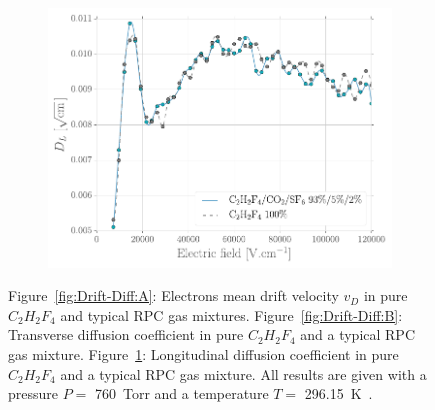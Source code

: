 \begin{figure}[H]
\begin{subfigure}{0.5\linewidth}
			\includegraphics[width = 0.55\plotwidth]{fig/chapt4/Diff_Long.pdf}
			\caption{\label{fig:Drift-Diff:C}}
		\end{subfigure}
		\caption{\label{fig:Drift-Diff} Figure~\ref{fig:Drift-Diff:A}: Electrons mean drift velocity $v_D$ in pure $C_2H_2F_4$ and typical RPC gas mixtures. Figure~\ref{fig:Drift-Diff:B}: Transverse diffusion coefficient in pure $C_2H_2F_4$ and a typical RPC gas mixture. Figure~\ref{fig:Drift-Diff:C}: Longitudinal diffusion coefficient in pure $C_2H_2F_4$ and a typical RPC gas mixture. All results are given with a pressure $P = $ \SI{760}{Torr} and a temperature $T =$ \SI{296.15}{K}~\cite{VINCENT2017}.}
	\end{figure}
	
